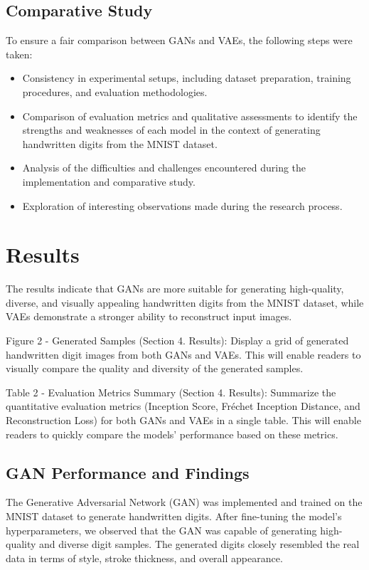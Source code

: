 \documentclass{article}
\begin{document}
\subsection{Comparative Study}
To ensure a fair comparison between GANs and VAEs, the following steps were taken:
\begin{itemize}
    \item Consistency in experimental setups, including dataset preparation, training procedures, and evaluation methodologies.
    \item Comparison of evaluation metrics and qualitative assessments to identify the strengths and weaknesses of each model in the context of generating handwritten digits from the MNIST dataset.
    \item Analysis of the difficulties and challenges encountered during the implementation and comparative study.
    \item Exploration of interesting observations made during the research process.
\end{itemize}

\section{Results}
The results indicate that GANs are more suitable for generating high-quality, diverse, and visually appealing handwritten digits from the MNIST dataset, while VAEs demonstrate a stronger ability to reconstruct input images.

Figure 2 - Generated Samples (Section 4. Results): Display a grid of generated handwritten digit images from both GANs and VAEs. This will enable readers to visually compare the quality and diversity of the generated samples.

Table 2 - Evaluation Metrics Summary (Section 4. Results): Summarize the quantitative evaluation metrics (Inception Score, Fréchet Inception Distance, and Reconstruction Loss) for both GANs and VAEs in a single table. This will enable readers to quickly compare the models' performance based on these metrics.

\subsection{GAN Performance and Findings}
The Generative Adversarial Network (GAN) was implemented and trained on the MNIST dataset to generate handwritten digits. After fine-tuning the model's hyperparameters, we observed that the GAN was capable of generating high-quality and diverse digit samples. The generated digits closely resembled the real data in terms of style, stroke thickness, and overall appearance.
\end{document}
